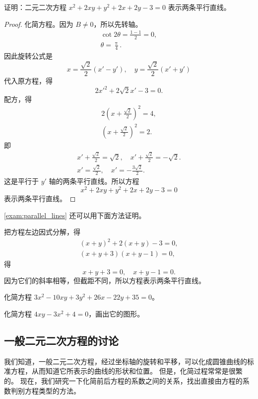 \begin{example}\label{exam:parallel_lines}
  证明：二元二次方程 $x^2+2xy+y^2+2x+2y-3=0$ 表示两条平行直线。
\end{example}
\begin{proof}
  化简方程。因为 $B\neq 0$，所以先转轴。
  \begin{gather*}
    \cot 2\theta=\frac{1-1}{2}=0,\\
    \theta=\frac{\uppi}{4}.
  \end{gather*}
  因此旋转公式是
  \[ x=\frac{\sqrt{2}}{2}(x'-y'),\quad y=\frac{\sqrt{2}}{2}(x'+y')\]
  代入原方程，得
  \[ 2x'^2+2\sqrt{2}x'-3=0.\]
  配方，得
  \begin{gather*}
    2\left(x+\frac{\sqrt{2}}{2}\right)^2=4,\\
    \left(x+\frac{\sqrt{2}}{2}\right)^2=2.
  \end{gather*}
  即
  \begin{gather*}
    x'+\frac{\sqrt{2}}{2}=\sqrt{2},\quad x'+\frac{\sqrt{2}}{2}=-\sqrt{2}.\\
    x'=\frac{\sqrt{2}}{2},\quad x'=-\frac{3\sqrt{2}}{2}.
  \end{gather*}
  这是平行于 $y'$ 轴的两条平行直线。所以方程
  \[x^2+2xy+y^2+2x+2y-3=0\]
  表示两条平行直线。
\end{proof}

\cref{exam:parallel_lines} 还可以用下面方法证明。

把方程左边因式分解，得
\begin{gather*}
  (x+y)^2+2(x+y)-3=0,\\
  (x+y+3)(x+y-1)=0,
\end{gather*}
得
\[ x+y+3=0,\quad x+y-1=0.\]
因为它们的斜率相等，但截距不同，所以方程表示两条平行直线。

\begin{Practice}
  \begin{question}
    \item 化简方程 $3x^2-10xy+3y^2+26x-22y+35=0$。
    \item 化简方程 $4xy-3x^2+4=0$，画出它的图形。
  \end{question}
\end{Practice}

\subsection{一般二元二次方程的讨论}
我们知道，一般二元二次方程，经过坐标轴的旋转和平移，可以化成圆锥曲线的标准方程，从而知道它所表示的曲线的形状和位置。
但是，化简过程常常是很繁的。
现在，我们研究一下化简前后方程的系数之间的关系，找出直接由方程的系数判别方程类型的方法。

